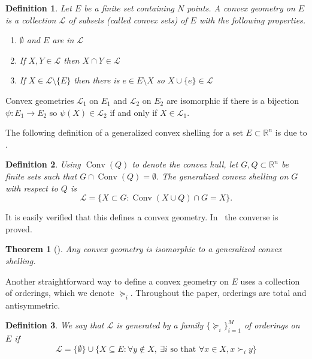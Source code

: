 \documentclass[12pt]{elsarticle}
\theoremstyle{plain}
\newtheorem{theorem}{Theorem}
\newtheorem{definition}{Definition}
\theoremstyle{definition}
\newcommand{\cgeom}{\mathcal{L}}
\DeclareMathOperator{\Hull}{Conv}
\begin{document}
\begin{definition}\label{defn:cgeom}
Let $E$ be a finite set containing $N$ points.  A convex geometry on $E$ is a collection $\cgeom$ of subsets (called convex sets) of $E$ with the following  properties.
\begin{enumerate}
\item $\emptyset$ and $E$ are in $\cgeom$
\item If $X,Y\in\cgeom$ then $X\cap Y\in\cgeom$
\item If $X\in\cgeom\setminus\{E\}$ then there is $e\in E\setminus X$ so $X\cup\{e\}\in\cgeom$\end{enumerate}
\end{definition}

Convex geometries $\cgeom_{1}$ on $E_{1}$ and $\cgeom_{2}$ on $E_{2}$ are isomorphic if there is a bijection $\psi :E_{1}\to E_{2}$ so $\psi(X)\in\cgeom_{2}$ if and only if $X\in\cgeom_{1}$.

\medskip

The following definition of a generalized convex shelling for a set $E\subset\mathbb{R}^{n}$ is due to \cite{KNO}.

\begin{definition}\label{defn:cvxshelling}
Using $\Hull(Q)$ to denote the convex hull, let $G,Q\subset\mathbb{R}^{n}$ be finite sets such that $G\cap\Hull(Q)=\emptyset$. The generalized convex shelling on $G$ with respect to $Q$ is
\begin{equation*}
	\cgeom = \bigl\{ X\subset G: \Hull(X\cup Q)\cap G=X\bigr\}.
	\end{equation*}
\end{definition}
It is easily verified that this defines a convex geometry.  In~\cite{KNO} the converse is proved.
\begin{theorem}[]\label{thm:KNO}
Any convex geometry is isomorphic to a generalized convex shelling.
\end{theorem}

Another straightforward way to define a convex geometry on $E$ uses a collection of orderings, which we denote $\succcurlyeq_{i}$.  Throughout the paper, orderings are total and antisymmetric.


\begin{definition}\label{defn:cgeomfromordering}
We say that $\cgeom$ is generated by a family $\{\succcurlyeq_{i}\}_{i=1}^{M}$  of orderings on $E$ if
\begin{equation*}
	\cgeom = \{\emptyset\}\cup\{ X \subseteq E: \forall y \notin X, \ \exists i \text{ so that }\forall x \in X, x \succ_i y \}
	\end{equation*}
\end{definition}
\end{document}
